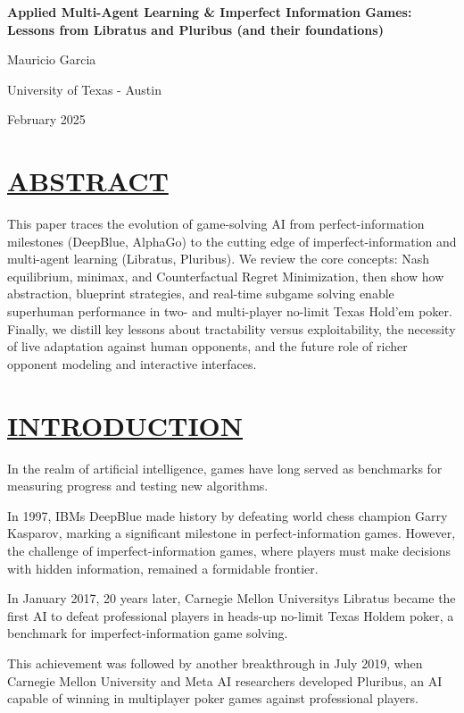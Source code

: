 \documentclass[
]{article}
\author{}
\date{}
\begin{document}
\textbf{Applied Multi-Agent Learning \& Imperfect Information Games:
Lessons from Libratus and Pluribus (and their foundations)}

Mauricio Garcia

University of Texas - Austin

February 2025

\section*{\texorpdfstring{\textbf{\ul{ABSTRACT}}}{ABSTRACT}}\label{abstract}

This paper traces the evolution of game-solving AI from
perfect-information milestones (DeepBlue, AlphaGo) to the cutting edge
of imperfect-information and multi-agent learning (Libratus, Pluribus).
We review the core concepts: Nash equilibrium, minimax, and
Counterfactual Regret Minimization, then show how abstraction, blueprint
strategies, and real-time subgame solving enable superhuman performance
in two- and multi-player no-limit Texas Hold'em poker. Finally, we
distill key lessons about tractability versus exploitability, the
necessity of live adaptation against human opponents, and the future
role of richer opponent modeling and interactive interfaces.

\section*{\texorpdfstring{\textbf{\ul{INTRODUCTION}}}{INTRODUCTION}}\label{introduction}

In the realm of artificial intelligence, games have long served as
benchmarks for measuring progress and testing new algorithms.

In 1997, IBM\textquotesingle s DeepBlue made history by defeating world
chess champion Garry Kasparov, marking a significant milestone in
perfect-information games. However, the challenge of
imperfect-information games, where players must make decisions with
hidden information, remained a formidable frontier.

In January 2017, 20 years later, Carnegie Mellon
University\textquotesingle s Libratus became the first AI to defeat
professional players in heads-up no-limit Texas Hold\textquotesingle em
poker, a benchmark for imperfect-information game solving.

This achievement was followed by another breakthrough in July 2019, when
Carnegie Mellon University and Meta AI researchers developed Pluribus,
an AI capable of winning in multiplayer poker games against professional
players.
\end{document}
